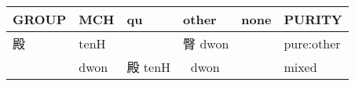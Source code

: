 \documentclass[14pt,a4paper]{scrartcl}
\begin{document}
\begin{longtable}[c]{@{}llllll@{}}
\toprule
\begin{minipage}[b]{0.14\columnwidth}\raggedright\strut
GROUP
\strut\end{minipage} &
\begin{minipage}[b]{0.14\columnwidth}\raggedright\strut
MCH
\strut\end{minipage} &
\begin{minipage}[b]{0.14\columnwidth}\raggedright\strut
qu
\strut\end{minipage} &
\begin{minipage}[b]{0.14\columnwidth}\raggedright\strut
other
\strut\end{minipage} &
\begin{minipage}[b]{0.14\columnwidth}\raggedright\strut
none
\strut\end{minipage} &
\begin{minipage}[b]{0.14\columnwidth}\raggedright\strut
PURITY
\strut\end{minipage}\tabularnewline
\midrule
\endhead
\begin{minipage}[t]{0.14\columnwidth}\raggedright\strut
殿
\strut\end{minipage} &
\begin{minipage}[t]{0.14\columnwidth}\raggedright\strut
tenH
\strut\end{minipage} &
\begin{minipage}[t]{0.14\columnwidth}\raggedright\strut
\strut\end{minipage} &
\begin{minipage}[t]{0.14\columnwidth}\raggedright\strut
臀 dwon
\strut\end{minipage} &
\begin{minipage}[t]{0.14\columnwidth}\raggedright\strut
\strut\end{minipage} &
\begin{minipage}[t]{0.14\columnwidth}\raggedright\strut
pure:other
\strut\end{minipage}\tabularnewline
\begin{minipage}[t]{0.14\columnwidth}\raggedright\strut
𡱂
\strut\end{minipage} &
\begin{minipage}[t]{0.14\columnwidth}\raggedright\strut
dwon
\strut\end{minipage} &
\begin{minipage}[t]{0.14\columnwidth}\raggedright\strut
殿 tenH
\strut\end{minipage} &
\begin{minipage}[t]{0.14\columnwidth}\raggedright\strut
𡱂 dwon
\strut\end{minipage} &
\begin{minipage}[t]{0.14\columnwidth}\raggedright\strut
\strut\end{minipage} &
\begin{minipage}[t]{0.14\columnwidth}\raggedright\strut
mixed
\strut\end{minipage}\tabularnewline
\bottomrule
\end{longtable}
\end{document}
